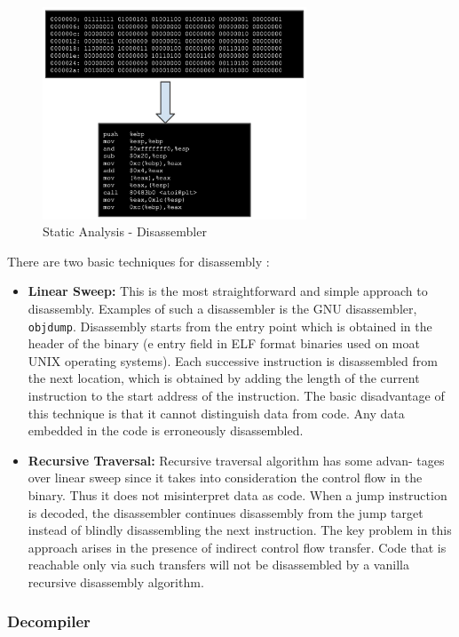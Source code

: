 \documentclass{article}
\begin{document}
\begin{figure}[H]
\centering
\includegraphics[width=0.7\textwidth]{img/disassembler.pdf}
\caption{Static Analysis - Disassembler}
\label{fig:disassembler}
\end{figure}

There are two basic techniques for disassembly \citep{stripped}:
\begin{itemize}
\item{\textbf{Linear Sweep:}} This is the most straightforward and simple approach to disassembly. 
Examples of such a disassembler is the GNU disassembler, \texttt{objdump}. Disassembly starts from the entry point which 
is obtained in the header of the binary (e entry field in ELF format binaries used on moat UNIX operating systems). 
Each successive instruction is disassembled from the next location, which is obtained by adding the length of the 
current instruction to the start address of the instruction. The basic disadvantage of this technique is that it 
cannot distinguish data from code. Any data embedded in the code is erroneously disassembled.
\item{\textbf{Recursive Traversal:}} Recursive traversal algorithm has some advan- tages over linear sweep since 
it takes into consideration the control flow in the binary. Thus it does not misinterpret data as code. When a 
jump instruction is decoded, the disassembler continues disassembly from the jump target instead of blindly 
disassembling the next instruction. The key problem in this approach arises in the presence of indirect control 
flow transfer. Code that is reachable only via such transfers will not be disassembled by a vanilla recursive 
disassembly algorithm.
\end{itemize}

\subsubsection{Decompiler}
\end{document}
